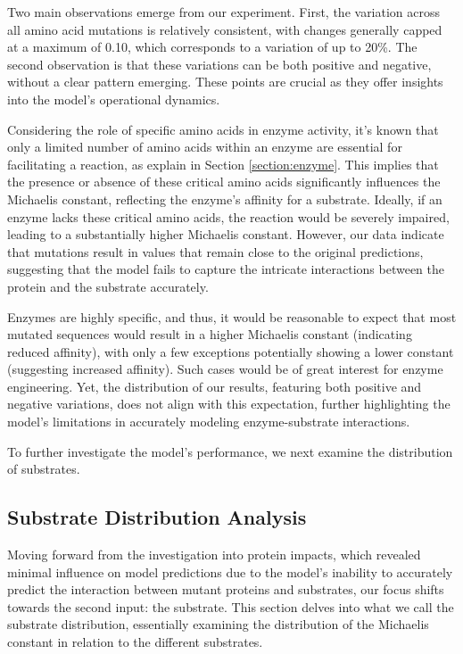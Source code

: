 Two main observations emerge from our experiment. First, the variation across all amino acid mutations is relatively consistent, with changes generally capped at a maximum of 0.10, which corresponds to a variation of up to 20\%. The second observation is that these variations can be both positive and negative, without a clear pattern emerging. These points are crucial as they offer insights into the model's operational dynamics.

Considering the role of specific amino acids in enzyme activity, it's known that only a limited number of amino acids within an enzyme are essential for facilitating a reaction, as explain in Section \ref{section:enzyme}. This implies that the presence or absence of these critical amino acids significantly influences the Michaelis constant, reflecting the enzyme's affinity for a substrate. Ideally, if an enzyme lacks these critical amino acids, the reaction would be severely impaired, leading to a substantially higher Michaelis constant. However, our data indicate that mutations result in values that remain close to the original predictions, suggesting that the model fails to capture the intricate interactions between the protein and the substrate accurately.
  
Enzymes are highly specific, and thus, it would be reasonable to expect that most mutated sequences would result in a higher Michaelis constant (indicating reduced affinity), with only a few exceptions potentially showing a lower constant (suggesting increased affinity). Such cases would be of great interest for enzyme engineering. Yet, the distribution of our results, featuring both positive and negative variations, does not align with this expectation, further highlighting the model's limitations in accurately modeling enzyme-substrate interactions.
  
To further investigate the model's performance, we next examine the distribution of substrates.

\subsection{Substrate Distribution Analysis}

Moving forward from the investigation into protein impacts, which revealed minimal influence on model predictions due to the model's inability to accurately predict the interaction between mutant proteins and substrates, our focus shifts towards the second input: the substrate. This section delves into what we call the substrate distribution, essentially examining the distribution of the Michaelis constant in relation to the different substrates.

